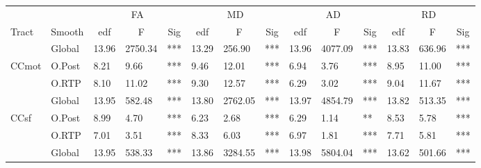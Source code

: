 
\begin{tabular}{lllll|lll|lll|lll}
\multicolumn{1}{c}{} & \multicolumn{1}{c}{} & \multicolumn{3}{c|}{FA} & \multicolumn{3}{c|}{MD} & \multicolumn{3}{c|}{AD} & \multicolumn{3}{c}{RD} \\ \cline{3-14}
Tract & Smooth & \multicolumn{1}{c}{edf} & \multicolumn{1}{c}{F} & \multicolumn{1}{c|}{Sig} & \multicolumn{1}{c}{edf} & \multicolumn{1}{c}{F} & \multicolumn{1}{c|}{Sig} & \multicolumn{1}{c}{edf} & \multicolumn{1}{c}{F} & \multicolumn{1}{c|}{Sig} & \multicolumn{1}{c}{edf} & \multicolumn{1}{c}{F} & \multicolumn{1}{c}{Sig} \\ \hline
 & \multicolumn{1}{l|}{Global} & 13.96 & 2750.34 & *** & 13.29 & 256.90 & *** & 13.96 & 4077.09 & *** & 13.83 & 636.96 & *** \\
CCmot & \multicolumn{1}{l|}{\cellcolor[HTML]{C0C0C0}O.Post} & \cellcolor[HTML]{C0C0C0}8.21 & \cellcolor[HTML]{C0C0C0}9.66 & \cellcolor[HTML]{C0C0C0}*** & \cellcolor[HTML]{C0C0C0}9.46 & \cellcolor[HTML]{C0C0C0}12.01 & \cellcolor[HTML]{C0C0C0}*** & \cellcolor[HTML]{C0C0C0}6.94 & \cellcolor[HTML]{C0C0C0}3.76 & \cellcolor[HTML]{C0C0C0}*** & \cellcolor[HTML]{C0C0C0}8.95 & \cellcolor[HTML]{C0C0C0}11.00 & \cellcolor[HTML]{C0C0C0}*** \\
 & \multicolumn{1}{l|}{O.RTP} & 8.10 & 11.02 & *** & 9.30 & 12.57 & *** & 6.29 & 3.02 & *** & 9.04 & 11.67 & *** \\
\rowcolor[HTML]{EFEFEF}
 & \multicolumn{1}{l|}{\cellcolor[HTML]{EFEFEF}Global} & 13.95 & 582.48 & *** & 13.80 & 2762.05 & *** & 13.97 & 4854.79 & *** & 13.82 & 513.35 & *** \\
\rowcolor[HTML]{C0C0C0}
\cellcolor[HTML]{EFEFEF}CCsf & \multicolumn{1}{l|}{\cellcolor[HTML]{C0C0C0}O.Post} & 8.99 & 4.70 & *** & 6.23 & 2.68 & *** & 6.29 & 1.14 & ** & 8.53 & 5.78 & *** \\
\rowcolor[HTML]{EFEFEF}
 & \multicolumn{1}{l|}{\cellcolor[HTML]{EFEFEF}O.RTP} & 7.01 & 3.51 & *** & 8.33 & 6.03 & *** & 6.97 & 1.81 & *** & 7.71 & 5.81 & *** \\
 & \multicolumn{1}{l|}{Global} & 13.95 & 538.33 & *** & 13.86 & 3284.55 & *** & 13.98 & 5804.04 & *** & 13.62 & 501.66 & *** \\

\end{tabular}
